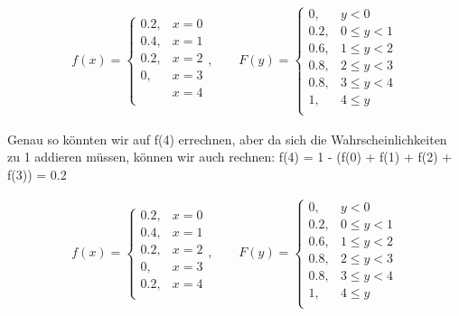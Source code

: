\documentclass[11pt, a4paper]{article}
\begin{document}
	\begin{align*}
		f(x) = 
		\begin{cases}
			0.2, & x = 0 \\
			0.4, & x = 1 \\
			0.2, & x = 2 \\
			0, & x = 3 \\
			& x = 4 \\
		\end{cases}, \qquad
		F(y) =
		\begin{cases}
			0, & y < 0 \\
			0.2, & 0 \leq y < 1 \\
			0.6, & 1 \leq y < 2 \\
			0.8, & 2 \leq y < 3 \\
			0.8, & 3 \leq y < 4 \\
			1, & 4 \leq y \\
		\end{cases}
	\end{align*}

	Genau so könnten wir auf f(4) errechnen, aber da sich die Wahrscheinlichkeiten zu 1 addieren müssen, können wir auch rechnen: f(4) = 1 - (f(0) + f(1) + f(2) + f(3)) = 0.2

	\begin{align*}
		f(x) = 
		\begin{cases}
			0.2, & x = 0 \\
			0.4, & x = 1 \\
			0.2, & x = 2 \\
			0, & x = 3 \\
			0.2, & x = 4 \\
		\end{cases}, \qquad
		F(y) =
		\begin{cases}
			0, & y < 0 \\
			0.2, & 0 \leq y < 1 \\
			0.6, & 1 \leq y < 2 \\
			0.8, & 2 \leq y < 3 \\
			0.8, & 3 \leq y < 4 \\
			1, & 4 \leq y \\
		\end{cases}
	\end{align*}
\fi

\newpage
\end{document}
